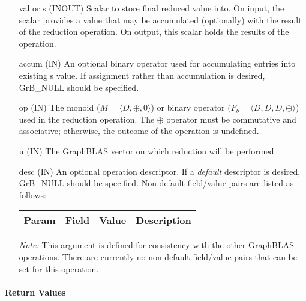 \begin{itemize}[leftmargin=1.1in]
    \item[{\sf val} or {\sf s}] ({\sf INOUT}) Scalar to store final reduced value into. On input,
    the scalar provides a value that may be accumulated (optionally) with the result of the
    reduction operation.  On output, this scalar holds the results of the
    operation.

    \item[{\sf accum}] ({\sf IN}) An optional binary operator used for accumulating
    entries into existing {\sf s} value. If assignment rather than accumulation is
    desired, {\sf GrB\_NULL} should be specified.

    \item[{\sf op}]    ({\sf IN}) The monoid ($M = \langle D,\oplus,0 \rangle$) or binary operator 
    ($F_b = \langle D, D, D, \oplus \rangle$) used in the reduction operation. The $\oplus$ operator 
    must be commutative and associative; otherwise, the outcome of the operation is undefined.  
    
    \item[{\sf u}]     ({\sf IN}) The GraphBLAS vector on which
    reduction will be performed.

    \item[{\sf desc}] ({\sf IN}) An optional operation descriptor. If
    a \emph{default} descriptor is desired, {\sf GrB\_NULL} should be
    specified. Non-default field/value pairs are listed as follows:  \\

    \begin{tabular}{lllp{2.5in}}
        Param & Field  & Value & Description \\
        \hline
    \end{tabular}

    \emph{Note:} This argument is defined for consistency with the other GraphBLAS operations.
    There are currently no non-default field/value pairs that can be set for this operation.
\end{itemize}

\paragraph{Return Values}


